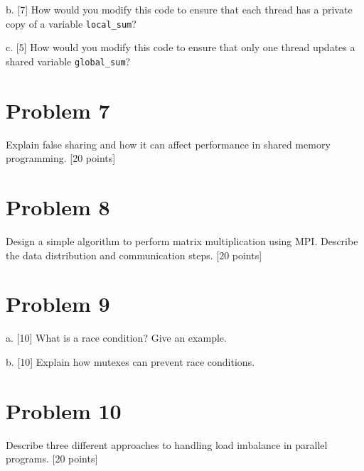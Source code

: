 \documentclass{article}
\begin{document}
b. [7] How would you modify this code to ensure that each thread has a private copy of a variable \texttt{local_sum}?

c. [5] How would you modify this code to ensure that only one thread updates a shared variable \texttt{global_sum}?


\section*{Problem 7}
Explain false sharing and how it can affect performance in shared memory programming. [20 points]


\section*{Problem 8}
Design a simple algorithm to perform matrix multiplication using MPI.  Describe the data distribution and communication steps. [20 points]


\section*{Problem 9}
a. [10] What is a race condition? Give an example.

b. [10] Explain how mutexes can prevent race conditions.


\section*{Problem 10}
Describe three different approaches to handling load imbalance in parallel programs. [20 points]
\end{document}

